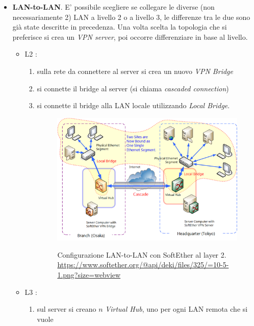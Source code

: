 \begin{itemize}
\begin{enumerate}
  \end{enumerate}
  \item \textbf{LAN-to-LAN}. E' possibile scegliere se collegare le diverse (non necessariamente 2) LAN
  a livello 2 o a livello 3, le differenze tra le due sono già state descritte
  in precedenza.
  Una volta scelta la topologia che si preferisce si crea un \textit{VPN server}, poi occorre
  differenziare in base al livello.
  \begin{itemize}
    \item L2 \cite{softether-l2-lan-to-lan}:
    \begin{enumerate}
      \item sulla rete da connettere al server si crea un nuovo \textit{VPN Bridge}
      \item si connette il bridge al server (si chiama \textit{cascaded connection})
      \item si connette il bridge alla LAN locale utilizzando \textit{Local Bridge}.
      \begin{figure}
        \includegraphics[scale=0.55]{img/softether_l2_lan_to_lan}
        \label{fig:softether_l2_lan_to_lan}
        \caption[Configurazione LAN-to-LAN con SoftEther al layer 2]{
          Configurazione LAN-to-LAN con SoftEther al layer 2.
          \url{https://www.softether.org/@api/deki/files/325/=10-5-1.png?size=webview}}
      \end{figure}
    \end{enumerate}
    \item L3 \cite{softether-l3-lan-to-lan}:
    \begin{enumerate}
      \item sul server si creano $n$ \textit{Virtual Hub}, uno per ogni LAN remota che si vuole

\end{enumerate}
\end{itemize}
\end{itemize}
